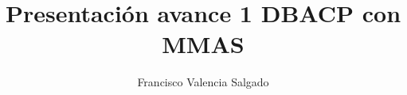 \documentclass[aspectratio=169,11pt]{beamer}
\title[Avance 1]{Presentación avance 1 DBACP con MMAS}
\author{Francisco Valencia Salgado}
\institute[USM]{Universidad Técnica Federico Santa María}
\date{}
\begin{document}
\begin{frame}
  \titlepage
\end{frame}

\end{document}
